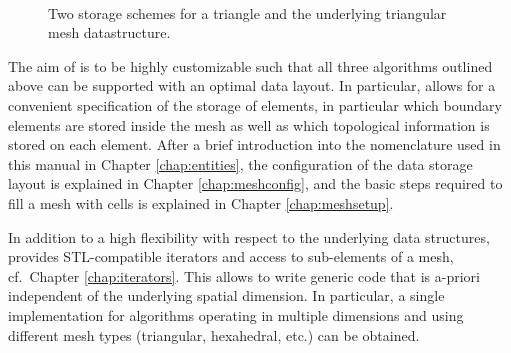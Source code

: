 \begin{figure}[bt]
 \centering
\mbox{
 \hspace{0.5cm}
 }
 \caption{Two storage schemes for a triangle and the underlying triangular mesh datastructure.}
 \label{fig:storage-schemes-triangle}
\end{figure}

The aim of {\ViennaGrid} is to be highly customizable such that all three algorithms outlined above can be supported with an optimal data layout. In particular, {\ViennaGrid} allows for a convenient specification of the storage of elements, in particular which boundary elements are stored inside the mesh as well as which topological information is stored on each element. After a brief introduction into the nomenclature used in this manual in Chapter \ref{chap:entities}, the configuration of the data storage layout is explained in Chapter \ref{chap:meshconfig}, and the basic steps required to fill a mesh with cells is explained in Chapter \ref{chap:meshsetup}.

In addition to a high flexibility with respect to the underlying data structures, {\ViennaGrid} provides STL-compatible iterators and access to sub-elements of a mesh, cf.~Chapter \ref{chap:iterators}. This allows to write generic code that is a-priori independent of the underlying spatial dimension. In particular, a single implementation for algorithms operating in multiple dimensions and using different mesh types (triangular, hexahedral, etc.) can be obtained.

